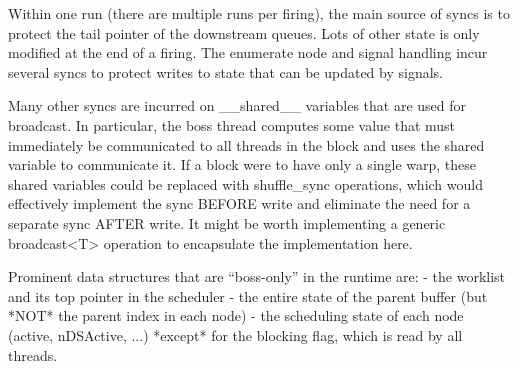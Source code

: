 Within one run (there are multiple runs per firing), the main source
of syncs is to protect the tail pointer of the downstream queues.
Lots of other state is only modified at the end of a firing.  The
enumerate node and signal handling incur several syncs to protect
writes to state that can be updated by signals.

Many other syncs are incurred on __shared__ variables that are used
for broadcast.  In particular, the boss thread computes some value
that must immediately be communicated to all threads in the block and
uses the shared variable to communicate it.  If a block were to have
only a single warp, these shared variables could be replaced with
shuffle_sync operations, which would effectively implement the sync
BEFORE write and eliminate the need for a separate sync AFTER write.
It might be worth implementing a generic broadcast<T> operation to
encapsulate the implementation here.

Prominent data structures that are ``boss-only'' in the runtime are:
 - the worklist and its top pointer in the scheduler
 - the entire state of the parent buffer (but *NOT* the parent index
   in each node)
 - the scheduling state of each node (active, nDSActive, ...) *except*
   for the blocking flag, which is read by all threads.
